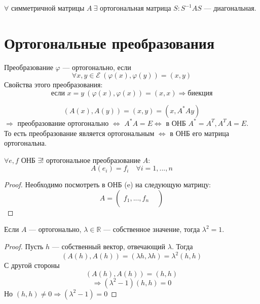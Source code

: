 \documentclass[11pt]{article}
\begin{document}
\begin{remark} $\forall$ симметричной матрицы $A \ \exists $ ортогональная матрица $S: S^{-1}AS$ --- диагональная. 
\end{remark}

\section{Ортогональные преобразования}

\begin{definition}
    Преобразование $\varphi$ --- ортогонально, если
    \[ \forall x,y\in \mathcal{E} \ (\varphi(x),\varphi(y)) = (x,y) \]
    Свойства этого преобразования: 
    \[ \text{если } x=y \ (\varphi(x),\varphi(x)) = (x,x) \Rightarrow \text{биекция} \]
\end{definition}



\begin{theorem}
    \[ (A(x),A(y)) = (x,y) = (x,A^*Ay) \]
    $\Rightarrow$ преобразование ортогонально $\Leftrightarrow$ $A^*A =E \Leftrightarrow$ в ОНБ $A^* = A^T, A^TA=E$.\\
    То есть преобразование является ортогональным $\Leftrightarrow$ в ОНБ его матрица ортогональна.
\end{theorem}

\begin{theorem}
    $\forall e,f$ ОНБ  $\exists! $ ортогональное преобразование $A$: 
    \[ A(e_i) = f_i \quad \forall i= 1,...,n \]
\end{theorem}

\begin{proof}
    Необходимо посмотреть в ОНБ (e) на следующую матрицу:
    \[ A= \begin{pmatrix}
        &\\
        f_1, ..., f_n\\
        &
    \end{pmatrix} \]
\end{proof}

\begin{theorem}
    Если $A$ --- ортогонально, $\lambda\in \mathbb{R}$ --- собственное значение, тогда $\lambda^2 =1 $.
\end{theorem}

\begin{proof}
    Пусть $h$ --- собственный вектор, отвечающий $\lambda$. Тогда 
    \[ (A(h), A(h)) = (\lambda h, \lambda h) = \lambda^2 (h,h)    \]
    С другой стороны
    \[ (A(h), A(h)) = (h,h) \]
    \[ \Rightarrow (\lambda^2 -1 ) (h,h) =0 \]
    Но $(h,h) \neq 0 \Rightarrow (\lambda^2 -1 ) =0$
\end{proof}
\end{document}
